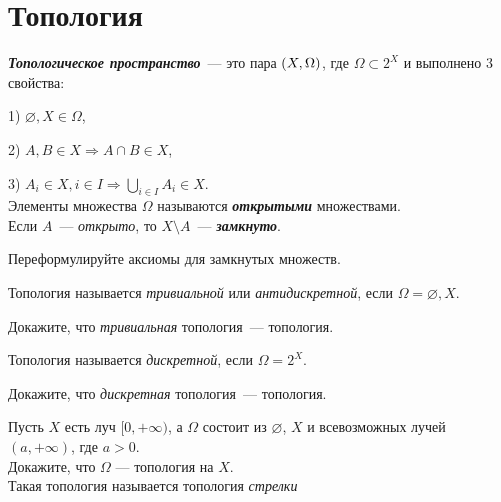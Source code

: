 \documentclass{article}
\begin{document}
    \large

    \setcounter{task_boxed}{0}


    \section{Топология}
    \begin{definition_boxed}
        \textit{\textbf{Топологическое пространство}}~--- это пара $\lr*{X, \Omega}$, где $\Omega \subset 2^X$ и выполнено 3 свойства:

        1) $\varnothing, X \in \Omega$,

        2) $A,B \in X \Rightarrow A \cap B \in X$,

        3) $A_i \in X, i \in I \Rightarrow \bigcup\limits_{i \in I} A_i \in X$.\\
        Элементы множества $\Omega$ называются \textbf{\textit{открытыми}} множествами.\\
        Если $A$~--- \textit{открыто}, то $X \setminus A$~--- \textbf{\textit{замкнуто}}.
    \end{definition_boxed}

    \begin{task_boxed}
        Переформулируйте аксиомы для замкнутых множеств.
    \end{task_boxed}

    \begin{example}
        Топология называется \textit{тривиальной} или \textit{антидискретной}, если $\Omega = {\varnothing, X}$.
    \end{example}

    \begin{task_boxed}
        Докажите, что \textit{тривиальная} топология~--- топология.
    \end{task_boxed}

    \begin{example}
        Топология называется \textit{дискретной}, если $\Omega = 2^X$.
    \end{example}

    \begin{task_boxed}
        Докажите, что \textit{дискретная} топология~--- топология.
    \end{task_boxed}

    \begin{task_boxed}
        Пусть $X$ есть луч $[0, +\infty)$, а $\Omega$ состоит из $\varnothing$, $X$ и всевозможных лучей $(a, +\infty)$, где $a > 0$.\\
        Докажите, что $\Omega$ — топология на $X$.\\
        Такая топология называется топология \textit{стрелки}
    \end{task_boxed}
\end{document}
